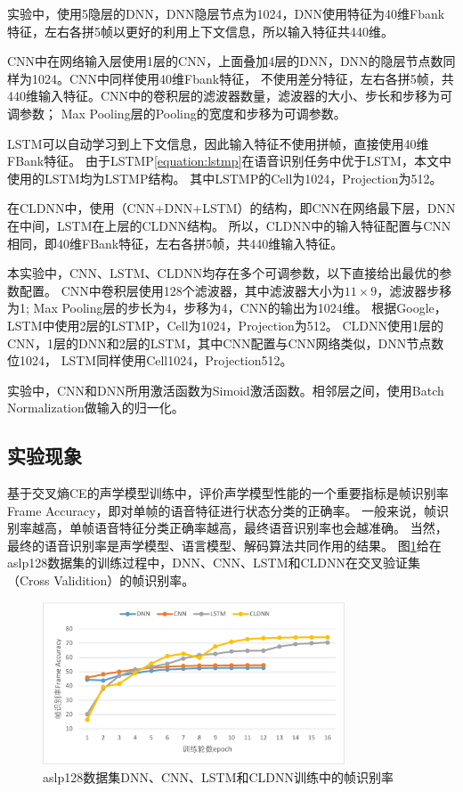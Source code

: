实验中，使用5隐层的DNN，DNN隐层节点为1024，DNN使用特征为40维Fbank特征，左右各拼5帧以更好的利用上下文信息，所以输入特征共440维。

CNN中在网络输入层使用1层的CNN，上面叠加4层的DNN，DNN的隐层节点数同样为1024。CNN中同样使用40维Fbank特征，
不使用差分特征，左右各拼5帧，共440维输入特征。CNN中的卷积层的滤波器数量，滤波器的大小、步长和步移为可调参数；
Max Pooling层的Pooling的宽度和步移为可调参数。

LSTM可以自动学习到上下文信息，因此输入特征不使用拼帧，直接使用40维FBank特征。
由于LSTMP\ref{equation:lstmp}在语音识别任务中优于LSTM，本文中使用的LSTM均为LSTMP结构。
其中LSTMP的Cell为1024，Projection为512。

在CLDNN中，使用（CNN+DNN+LSTM）的结构，即CNN在网络最下层，DNN在中间，LSTM在上层的CLDNN结构。
所以，CLDNN中的输入特征配置与CNN相同，即40维FBank特征，左右各拼5帧，共440维输入特征。

本实验中，CNN、LSTM、CLDNN均存在多个可调参数，以下直接给出最优的参数配置。
CNN中卷积层使用128个滤波器，其中滤波器大小为$11 \times 9$，滤波器步移为1;
Max Pooling层的步长为4，步移为4，CNN的输出为1024维。
根据Google，LSTM中使用2层的LSTMP，Cell为1024，Projection为512。
CLDNN使用1层的CNN，1层的DNN和2层的LSTM，其中CNN配置与CNN网络类似，DNN节点数位1024，
LSTM同样使用Cell1024，Projection512。

实验中，CNN和DNN所用激活函数为Simoid激活函数。相邻层之间，使用Batch Normalization做输入的归一化。

\subsection{实验现象}

基于交叉熵CE的声学模型训练中，评价声学模型性能的一个重要指标是帧识别率Frame Accuracy，即对单帧的语音特征进行状态分类的正确率。
一般来说，帧识别率越高，单帧语音特征分类正确率越高，最终语音识别率也会越准确。
当然，最终的语音识别率是声学模型、语言模型、解码算法共同作用的结果。
图\ref{fig:acc}给在aslp128数据集的训练过程中，DNN、CNN、LSTM和CLDNN在交叉验证集（Cross Validition）的帧识别率。

\begin{figure}[htbp]
\centering
\includegraphics[width=0.8\textwidth]{figures/chapter3/acc-crop}
\caption{aslp128数据集DNN、CNN、LSTM和CLDNN训练中的帧识别率}
\label{fig:acc}
\end{figure}

